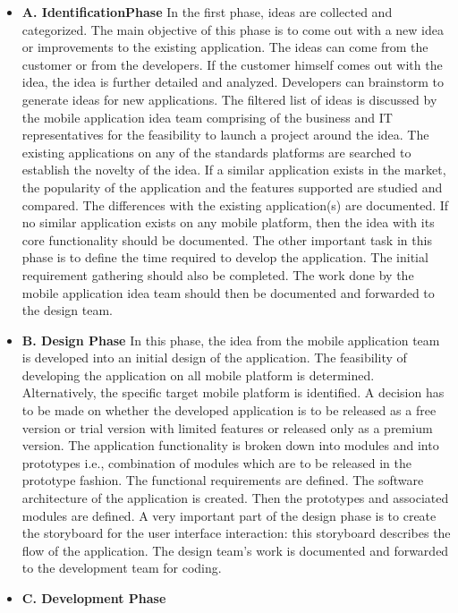 \documentclass[10pt,slovak,a4paper]{article}
\begin{document}
\begin{itemize}
  \item \textbf{A. IdentificationPhase}
In the first phase, ideas are collected and categorized. The main objective of this phase is to come out with a new idea or improvements to the existing application. The ideas can come from the customer or from the developers.
If the customer himself comes out with the idea, the idea is further detailed and analyzed. Developers can brainstorm to generate ideas for new applications. The filtered list of ideas is discussed by the mobile application idea team comprising of the business and IT representatives for the feasibility to launch a project around the idea.
The existing applications on any of the standards platforms are searched to establish the novelty of the idea. If a similar application exists in the market, the popularity of the application and the features supported are studied and compared. The differences with the existing application(s) are documented. If no similar application exists on any mobile platform, then the idea with its core functionality should be documented. The other important task in this phase is to define the time required to develop the application. The initial requirement gathering should also be completed. The work done by the mobile application idea team should then be documented and forwarded to the design team.
  \item \textbf{B. Design Phase}
In this phase, the idea from the mobile application team is developed into an initial design of the application.
The feasibility of developing the application on all mobile platform is determined. Alternatively, the specific target mobile platform is identified. A decision has to be made on whether the developed application is to be released as a free version or trial version with limited features or released only as a premium version. The application functionality is broken down into modules and into prototypes i.e., combination of modules which are to be released in the prototype fashion. The functional requirements are defined. The software architecture of the application is created. Then the prototypes and associated modules are defined. A very important part of the design phase is to create the storyboard for the user interface interaction: this storyboard describes the flow of the application. The design team’s work is documented and forwarded to the development team for coding.
  \item \textbf{C. Development Phase}

\end{itemize}
\end{document}
